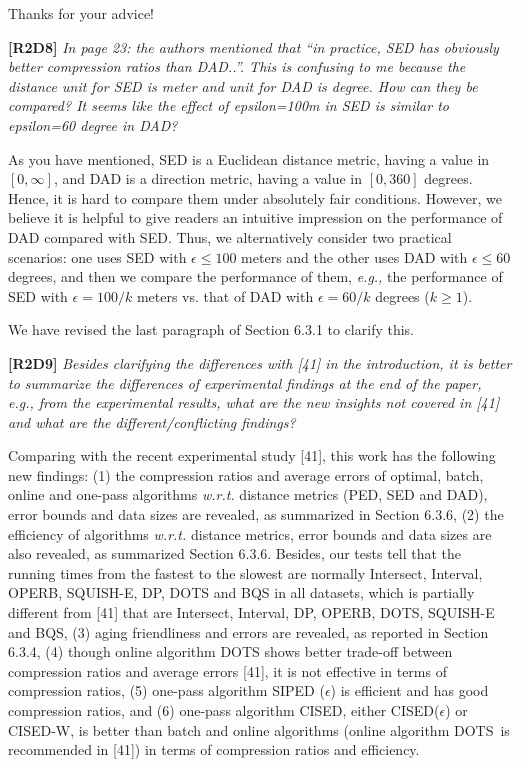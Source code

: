 \documentclass{letter}
\newcommand{\eg}{\emph{e.g.,}\xspace}
\newcommand{\wrt}{\emph{w.r.t.}\xspace}
\begin{document}
Thanks for your advice!


\textbf{[R2D8]} \emph{In page 23: the authors mentioned that ``in practice, SED has obviously better compression ratios than DAD..''. This is confusing to me because the distance unit for SED is meter and unit for DAD is degree. How can they be compared? It seems like the effect of epsilon=100m in SED is similar to epsilon=60 degree in DAD?}

As you have mentioned, SED is a Euclidean distance metric, having a value in $[0, \infty]$, and DAD is a direction metric, having a value in $[0, 360]$ degrees. Hence, it is hard to compare them under absolutely fair conditions. However, we believe it is helpful to give readers an intuitive impression on the performance of DAD compared with SED. Thus, we alternatively consider two practical scenarios: one uses SED with $\epsilon  \le  100$ meters and the other uses DAD with $\epsilon \le 60$ degrees, and then we compare the performance of them, \eg the performance of SED with $\epsilon=100/k$ meters vs. that of DAD with $\epsilon=60/k$ degrees ($k\ge 1$).


{We have revised the last paragraph of Section 6.3.1 to clarify this. }

\textbf{[R2D9]} \emph{Besides clarifying the differences with [41] in the introduction, it is better to summarize the differences of experimental findings at the end of the paper, e.g., from the experimental results, what are the new insights not covered in [41] and what are the different/conflicting findings?}

Comparing with the recent experimental study [41], this work has the following new findings:
(1) the compression ratios and average errors of optimal, batch, online and one-pass algorithms \wrt distance metrics (PED, SED and DAD), error bounds and data sizes are revealed, as summarized in Section 6.3.6,
(2) the efficiency of algorithms \wrt distance metrics, error bounds and data sizes are also revealed, as summarized Section 6.3.6. Besides, our tests tell that the running times from the fastest to the slowest are normally Intersect, Interval, OPERB, SQUISH-E, DP, DOTS and BQS in all datasets, which is partially different from [41] that are Intersect, Interval, DP, OPERB, DOTS, SQUISH-E and BQS,
(3) aging friendliness and errors are revealed, as reported in Section 6.3.4,
(4) though online algorithm DOTS shows better trade-off between compression ratios and average errors [41], it is not effective in terms of compression ratios,
(5) one-pass algorithm SIPED ($\epsilon$) is efficient and has good compression ratios, and
(6) one-pass algorithm CISED, either CISED($\epsilon$) or CISED-W, is better than batch and online algorithms (online algorithm DOTS~is recommended in [41]) in terms of compression ratios and efficiency.
\end{document}
